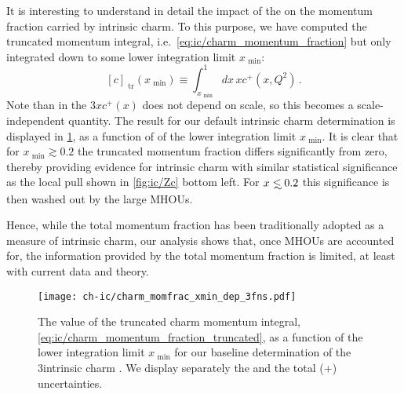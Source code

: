 It is interesting to understand in detail the impact of the \mhou on
the momentum fraction carried by intrinsic charm. To this purpose, we
have computed  the truncated momentum integral, i.e.\ 
  \cref{eq:ic/charm_momentum_fraction} but only integrated down to
  some  lower
  integration limit $x_\textrm{ min}$:
  \begin{equation}
\label{eq:ic/charm_momentum_fraction_truncated}
\left[ c\right]_\textrm{ tr}(x_\textrm{ min}) \equiv \int_{x_\textrm{ min}}^1dx\, x c^+(x,Q^2) \, .
\end{equation}
Note than in the 3\fns   $x
c^+(x)$ does not depend on scale, so  this becomes
a scale-independent quantity.
%
The result for our default intrinsic charm determination is displayed
in \cref{fig:ic/charm_momfrac_xmin_dep}, as a function of
of the lower integration limit $x_\textrm{ min}$.
%
It is clear that for $x_\textrm{ min} \gtrsim 0.2$ the truncated momentum
fraction  differs significantly from zero, thereby providing evidence
for intrinsic charm with similar statistical  significance as the
local pull shown in \cref{fig:ic/Zc} bottom left.
%
For $x \lsim 0.2$
this  significance is then washed out
by the large MHOUs.

Hence, while the total momentum fraction has been traditionally adopted
as a measure of intrinsic charm, 
our analysis shows that, once MHOUs are accounted for, the information
provided by the total momentum fraction is limited, at least with
current data and theory.



\begin{figure}[h!]
  \begin{center}
    \texttt{[image: ch-ic/charm\_momfrac\_xmin\_dep\_3fns.pdf]}
    \caption{\small The value of the truncated charm momentum integral,
      \cref{eq:ic/charm_momentum_fraction_truncated}, as a function
      of the lower integration limit $x_\textrm{ min}$
      for our baseline determination of the 3\fns intrinsic charm \pdf.
      We display separately the \pdf and the total (\pdf+\mhou) uncertainties.
  \label{fig:ic/charm_momfrac_xmin_dep} }
\end{center}
\end{figure}
